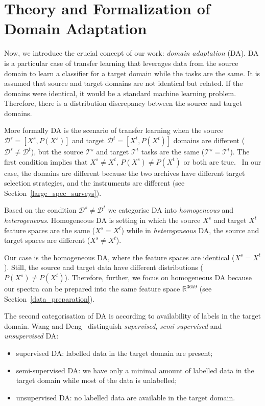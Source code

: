 \section{Theory and Formalization of Domain Adaptation}

Now, we introduce the crucial concept of our work: \textit{domain adaptation} (DA).
DA is a particular case of transfer learning
that leverages data from the source domain to learn a classifier for a target domain while the tasks are the same.
It is assumed that source and target domains are not identical but related.
If the domains were identical, it would be a standard machine learning problem.
Therefore, there is a distribution discrepancy between the source and target domains.~\cite{csurka2017}

More formally DA is the scenario of transfer learning
when the source \(\mathcal{D}^s = [X^s, P(X^s)]\)
and target \(\mathcal{D}^t = [X^t, P(X^t)]\) domains
are different (\(\mathcal{D}^s \ne \mathcal{D}^t\)),
but the source \(\mathcal{T}^s\) and target \(\mathcal{T}^t\)
tasks are the same (\(\mathcal{T}^s = \mathcal{T}^t\)).
The first condition implies
that \(X^s \ne X^t\), \(P(X^s) \ne P(X^t)\) or both are true.~\cite{pan2010}
In our case, the domains are different
because the two archives have different target selection strategies,
and the instruments are different (see Section~\ref{large_spec_surveys}).

Based on the condition \(\mathcal{D}^s \ne \mathcal{D}^t\)
we categorise DA into \textit{homogeneous} and \textit{heterogeneous}.
Homogeneous DA is setting in which the source \(X^s\)
and target \(X^t\) feature spaces are the same (\(X^s = X^t\))
while in \textit{heterogeneous} DA, the source and target spaces are different
(\(X^s \ne X^t\)).~\cite{csurka2017}

Our case is the homogeneous DA,
where the feature spaces are identical (\(X^s = X^t\)).
Still, the source and target data have different distributions (\(P(X^s) \ne P(X^t)\)).
Therefore, further, we focus on homogeneous DA
because our spectra can be prepared into the same feature space \(\mathbb{R}^{3659}\)
(see Section~\ref{data_preparation}).

The second categorisation of DA is according to availability of labels in the target domain.
Wang and Deng~\cite{wang2018} distinguish \textit{supervised}, \textit{semi-supervised} and \textit{unsupervised} DA:

\begin{itemize}
	\item supervised DA: labelled data in the target domain are present;
	\item semi-supervised DA: we have only a minimal amount of labelled data in the target domain while most of the data is unlabelled;
	\item unsupervised DA: no labelled data are available in the target domain.
\end{itemize}

